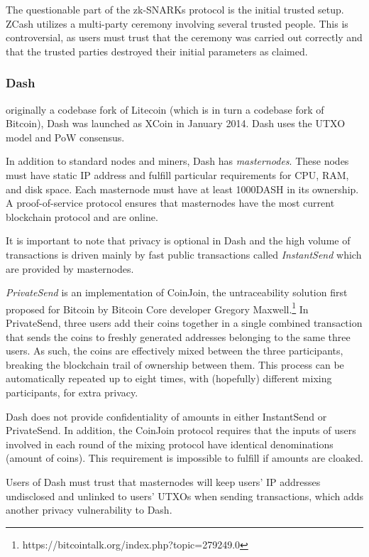 \documentclass[a4paper, 10pt, conference]{ieeeconf}
\begin{document}
The questionable part of the zk-SNARKs protocol is the initial trusted setup. ZCash utilizes a multi-party ceremony involving several trusted people. This is controversial, as users must trust that the ceremony was carried out correctly and that the trusted parties destroyed their initial parameters as claimed. 

\subsubsection{Dash} originally a codebase fork of Litecoin (which is in turn a codebase fork of Bitcoin), Dash was launched as XCoin in January 2014. Dash uses the UTXO model and PoW consensus. 

In addition to standard nodes and miners, Dash has \textit{masternodes}. These nodes  must have static IP address and fulfill particular requirements for CPU, RAM, and disk space. Each masternode must have at least 1000DASH in its ownership. A proof-of-service protocol ensures that masternodes have the most current blockchain protocol and are online. 

It is important to note that privacy is optional in Dash and the high volume of transactions is driven mainly by fast public transactions called \textit{InstantSend} which are provided by masternodes.

\textit{PrivateSend} is an implementation of CoinJoin, the untraceability solution first proposed for Bitcoin by Bitcoin Core developer Gregory Maxwell.\footnote{https://bitcointalk.org/index.php?topic=279249.0} In PrivateSend, three users add their coins together in a single combined transaction that sends the coins to freshly generated addresses belonging to the same three users. As such, the coins are effectively mixed between the three participants, breaking the blockchain trail of ownership between them. This process can be automatically repeated up to eight times, with (hopefully) different mixing participants, for extra privacy.

Dash does not provide confidentiality of amounts in either InstantSend or PrivateSend. In addition, the CoinJoin protocol requires that the inputs of users involved in each round of the mixing protocol have identical denominations (amount of coins). This requirement is impossible to fulfill if amounts are cloaked. 

Users of Dash must trust that masternodes will keep users' IP addresses undisclosed and unlinked to users' UTXOs when sending transactions, which adds another privacy vulnerability to Dash.
\end{document}
